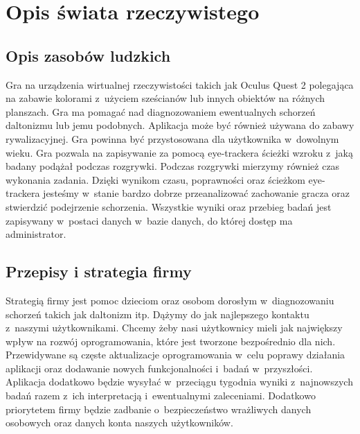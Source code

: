 \documentclass[12pt, letterpaper]{article}
\begin{document}
\newpage

\tableofcontents

\newpage


\section{Opis świata rzeczywistego}

	\subsection{Opis zasobów ludzkich}

	Gra na urządzenia wirtualnej rzeczywistości takich jak Oculus Quest 2 polegająca na zabawie kolorami z~użyciem sześcianów lub innych obiektów na różnych planszach. Gra ma pomagać nad diagnozowaniem ewentualnych schorzeń daltonizmu lub jemu podobnych. Aplikacja może być również używana do zabawy rywalizacyjnej. Gra powinna być przystosowana dla użytkownika w~dowolnym wieku. Gra pozwala na zapisywanie za pomocą eye-trackera ścieżki wzroku z~jaką badany podążał podczas rozgrywki. Podczas rozgrywki mierzymy również czas wykonania zadania. Dzięki wynikom czasu, poprawności oraz ścieżkom eye-trackera jesteśmy w~stanie bardzo dobrze przeanalizować zachowanie gracza oraz stwierdzić podejrzenie schorzenia. Wszystkie wyniki oraz przebieg badań jest zapisywany w~postaci danych w~bazie danych, do której dostęp ma administrator.
	

	\subsection{Przepisy i strategia firmy}
	
	Strategią firmy jest pomoc dzieciom oraz osobom dorosłym w~diagnozowaniu schorzeń takich jak daltonizm itp. Dążymy do jak najlepszego kontaktu z~naszymi użytkownikami. Chcemy żeby nasi użytkownicy mieli jak największy wpływ na rozwój oprogramowania, które jest tworzone bezpośrednio dla nich. Przewidywane są częste aktualizacje oprogramowania w~celu poprawy działania aplikacji oraz dodawanie nowych funkcjonalności i~badań w~przyszłości. Aplikacja dodatkowo będzie wysyłać w~przeciągu tygodnia wyniki z~najnowszych badań razem z~ich interpretacją i~ewentualnymi zaleceniami. Dodatkowo priorytetem firmy będzie zadbanie o~bezpieczeństwo wrażliwych danych osobowych oraz danych konta naszych użytkowników.
	
\end{document}
